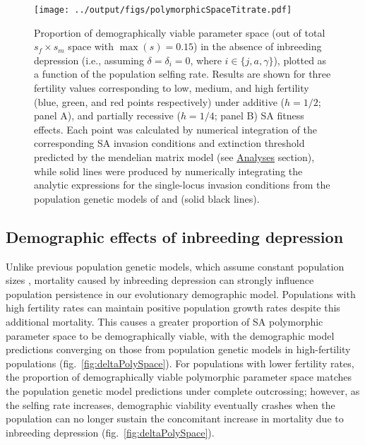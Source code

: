 \documentclass[11pt]{article}
\begin{document}
 \begin{figure}[htbp]
 \centering
 \texttt{[image: ../output/figs/polymorphicSpaceTitrate.pdf]}
 \caption{\footnotesize{Proportion of demographically viable parameter space (out of total $s_f \times s_m$ space with $\max(s) = 0.15$) in the absence of inbreeding depression (i.e., assuming $\delta = \delta_i = 0$, where $i \in \{j,a,\gamma\}$), plotted as a function of the population selfing rate. Results are shown for three fertility values corresponding to low, medium, and high fertility (blue, green, and red points respectively) under additive ($h = 1/2$; panel A), and partially recessive ($h = 1/4$; panel B) SA fitness effects. Each point was calculated by numerical integration of the corresponding SA invasion conditions and extinction threshold predicted by the mendelian matrix model (see \hyperref[subsec:analyses]{Analyses} section), while solid lines were produced by numerically integrating the analytic expressions for the single-locus invasion conditions from the population genetic models of \citet{JordanConnallon2014} and \citet{Olito2017} (solid black lines).}} 
 \label{fig:polySpace}
 \end{figure}



\subsection*{Demographic effects of inbreeding depression} \label{subsec:InbreedEffects}

Unlike previous population genetic models, which assume constant population sizes \citep{JordanConnallon2014,Olito2017}, mortality caused by inbreeding depression can strongly influence population persistence in our evolutionary demographic model. Populations with high fertility rates can maintain positive population growth rates despite this additional mortality. This causes a greater proportion of SA polymorphic parameter space to be demographically viable, with the demographic model predictions converging on those from population genetic models in high-fertility populations (fig.~\ref{fig:deltaPolySpace}). For populations with lower fertility rates, the proportion of demographically viable polymorphic parameter space matches the population genetic model predictions under complete outcrossing; however, as the selfing rate increases, demographic viability eventually crashes when the population can no longer sustain the concomitant increase in mortality due to inbreeding depression (fig.~\ref{fig:deltaPolySpace}). 
\end{document}
